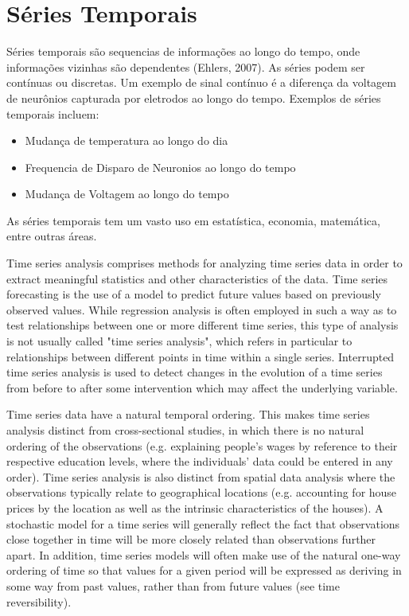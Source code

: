 \chapter{Séries Temporais}

Séries temporais são sequencias de informações ao longo do tempo, onde informações vizinhas são dependentes (Ehlers, 2007). 
As séries podem ser contínuas ou discretas. Um exemplo de sinal contínuo é a diferença da voltagem de neurônios
capturada por eletrodos ao longo do tempo. Exemplos de séries temporais incluem:
\begin{itemize}
    \item Mudança de temperatura ao longo do dia
    \item Frequencia de Disparo de Neuronios ao longo do tempo
    \item Mudança de Voltagem ao longo do tempo 
\end{itemize}

As séries temporais tem um vasto uso em estatística, economia, matemática, entre outras áreas. 

Time series analysis comprises methods for analyzing time series data in order to extract meaningful statistics and other characteristics of the data.
 Time series forecasting is the use of a model to predict future values based on previously observed values. 
 While regression analysis is often employed in such a way as to test relationships between one or more different time series,
  this type of analysis is not usually called "time series analysis", 
  which refers in particular to relationships between different points in time within a single series. 
  Interrupted time series analysis is used to detect changes in the evolution of a time series from before 
  to after some intervention which may affect the underlying variable.

Time series data have a natural temporal ordering. This makes time series analysis distinct from cross-sectional studies, in which there is no natural ordering of the observations (e.g. explaining people's wages by reference to their respective education levels, where the individuals' data could be entered in any order). Time series analysis is also distinct from spatial data analysis where the observations typically relate to geographical locations (e.g. accounting for house prices by the location as well as the intrinsic characteristics of the houses). A stochastic model for a time series will generally reflect the fact that observations close together in time will be more closely related than observations further apart. In addition, time series models will often make use of the natural one-way ordering of time so that values for a given period will be expressed as deriving in some way from past values, rather than from future values (see time reversibility).


